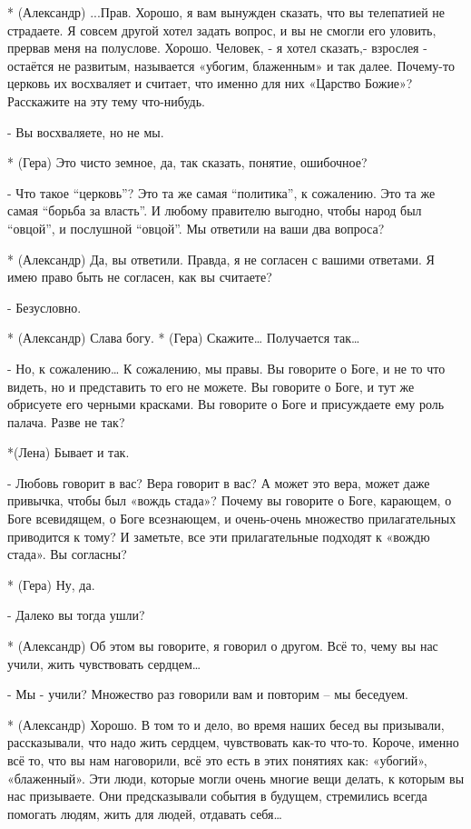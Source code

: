 * (Александр) ...Прав. Хорошо, я вам вынужден сказать, что вы телепатией не страдаете. Я совсем другой хотел задать вопрос, и вы не смогли его уловить, прервав меня на полуслове. Хорошо. Человек, - я хотел сказать,-  взрослея - остаётся не развитым, называется «убогим, блаженным» и так далее. Почему-то церковь их восхваляет и считает, что именно для них «Царство Божие»? Расскажите на эту тему что-нибудь.

- Вы восхваляете, но не мы.

* (Гера) Это чисто земное, да, так сказать, понятие, ошибочное?

- Что такое “церковь”? Это та же самая “политика”, к сожалению. Это та же самая “борьба за власть”. И любому правителю выгодно, чтобы народ был “овцой”, и послушной “овцой”. Мы ответили на ваши два вопроса?

* (Александр) Да, вы ответили. Правда, я не согласен с вашими ответами.  Я имею право быть не согласен, как вы считаете?

- Безусловно. 

* (Александр) Слава богу. 
* (Гера) Скажите… Получается так…

- Но, к сожалению… К сожалению, мы правы. Вы говорите о Боге, и не то что видеть, но и представить то его не можете. Вы говорите о Боге, и тут же обрисуете его черными красками. Вы говорите о Боге и присуждаете ему роль палача. Разве не так? 

*(Лена) Бывает и так.

- Любовь говорит в вас? Вера говорит в вас? А может это вера, может даже привычка, чтобы был «вождь стада»? Почему вы говорите о Боге, карающем, о Боге всевидящем, о Боге всезнающем, и очень-очень множество прилагательных приводится к тому? И заметьте, все эти прилагательные подходят к «вождю стада». Вы согласны?

* (Гера) Ну, да.

- Далеко вы тогда ушли?

* (Александр) Об этом вы говорите, я говорил о другом. Всё то, чему вы нас учили, жить чувствовать сердцем…

- Мы - учили? Множество раз говорили вам и повторим – мы беседуем.

* (Александр) Хорошо. В том то и дело, во время наших бесед вы призывали, рассказывали, что надо жить сердцем, чувствовать как-то что-то. Короче, именно всё то, что вы нам наговорили, всё это есть в этих понятиях как: «убогий», «блаженный». Эти люди, которые могли очень многие вещи делать, к которым вы нас призываете. Они предсказывали события в будущем, стремились всегда помогать людям, жить для людей, отдавать себя…


